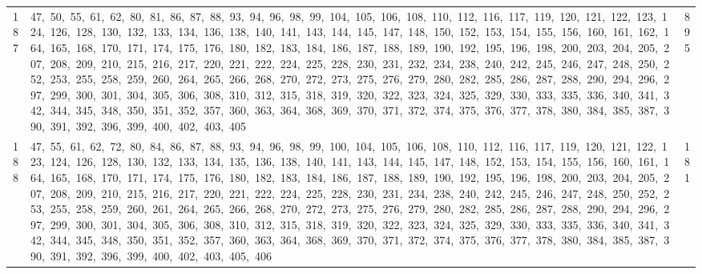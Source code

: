 \begin{longtable}{c|p{}|r}
187 & 47,\ 50,\ 55,\ 61,\ 62,\ 80,\ 81,\ 86,\ 87,\ 88,\ 93,\ 94,\ 96,\ 98,\ 99,\ 104,\ 105,\ 106,\ 108,\ 110,\ 112,\ 116,\ 117,\ 119,\ 120,\ 121,\ 122,\ 123,\ 124,\ 126,\ 128,\ 130,\ 132,\ 133,\ 134,\ 136,\ 138,\ 140,\ 141,\ 143,\ 144,\ 145,\ 147,\ 148,\ 150,\ 152,\ 153,\ 154,\ 155,\ 156,\ 160,\ 161,\ 162,\ 164,\ 165,\ 168,\ 170,\ 171,\ 174,\ 175,\ 176,\ 180,\ 182,\ 183,\ 184,\ 186,\ 187,\ 188,\ 189,\ 190,\ 192,\ 195,\ 196,\ 198,\ 200,\ 203,\ 204,\ 205,\ 207,\ 208,\ 209,\ 210,\ 215,\ 216,\ 217,\ 220,\ 221,\ 222,\ 224,\ 225,\ 228,\ 230,\ 231,\ 232,\ 234,\ 238,\ 240,\ 242,\ 245,\ 246,\ 247,\ 248,\ 250,\ 252,\ 253,\ 255,\ 258,\ 259,\ 260,\ 264,\ 265,\ 266,\ 268,\ 270,\ 272,\ 273,\ 275,\ 276,\ 279,\ 280,\ 282,\ 285,\ 286,\ 287,\ 288,\ 290,\ 294,\ 296,\ 297,\ 299,\ 300,\ 301,\ 304,\ 305,\ 306,\ 308,\ 310,\ 312,\ 315,\ 318,\ 319,\ 320,\ 322,\ 323,\ 324,\ 325,\ 329,\ 330,\ 333,\ 335,\ 336,\ 340,\ 341,\ 342,\ 344,\ 345,\ 348,\ 350,\ 351,\ 352,\ 357,\ 360,\ 363,\ 364,\ 368,\ 369,\ 370,\ 371,\ 372,\ 374,\ 375,\ 376,\ 377,\ 378,\ 380,\ 384,\ 385,\ 387,\ 390,\ 391,\ 392,\ 396,\ 399,\ 400,\ 402,\ 403,\ 405 & 895 \\
188 & 47,\ 55,\ 61,\ 62,\ 72,\ 80,\ 84,\ 86,\ 87,\ 88,\ 93,\ 94,\ 96,\ 98,\ 99,\ 100,\ 104,\ 105,\ 106,\ 108,\ 110,\ 112,\ 116,\ 117,\ 119,\ 120,\ 121,\ 122,\ 123,\ 124,\ 126,\ 128,\ 130,\ 132,\ 133,\ 134,\ 135,\ 136,\ 138,\ 140,\ 141,\ 143,\ 144,\ 145,\ 147,\ 148,\ 152,\ 153,\ 154,\ 155,\ 156,\ 160,\ 161,\ 164,\ 165,\ 168,\ 170,\ 171,\ 174,\ 175,\ 176,\ 180,\ 182,\ 183,\ 184,\ 186,\ 187,\ 188,\ 189,\ 190,\ 192,\ 195,\ 196,\ 198,\ 200,\ 203,\ 204,\ 205,\ 207,\ 208,\ 209,\ 210,\ 215,\ 216,\ 217,\ 220,\ 221,\ 222,\ 224,\ 225,\ 228,\ 230,\ 231,\ 234,\ 238,\ 240,\ 242,\ 245,\ 246,\ 247,\ 248,\ 250,\ 252,\ 253,\ 255,\ 258,\ 259,\ 260,\ 261,\ 264,\ 265,\ 266,\ 268,\ 270,\ 272,\ 273,\ 275,\ 276,\ 279,\ 280,\ 282,\ 285,\ 286,\ 287,\ 288,\ 290,\ 294,\ 296,\ 297,\ 299,\ 300,\ 301,\ 304,\ 305,\ 306,\ 308,\ 310,\ 312,\ 315,\ 318,\ 319,\ 320,\ 322,\ 323,\ 324,\ 325,\ 329,\ 330,\ 333,\ 335,\ 336,\ 340,\ 341,\ 342,\ 344,\ 345,\ 348,\ 350,\ 351,\ 352,\ 357,\ 360,\ 363,\ 364,\ 368,\ 369,\ 370,\ 371,\ 372,\ 374,\ 375,\ 376,\ 377,\ 378,\ 380,\ 384,\ 385,\ 387,\ 390,\ 391,\ 392,\ 396,\ 399,\ 400,\ 402,\ 403,\ 405,\ 406 & 181 \\

\end{longtable}
